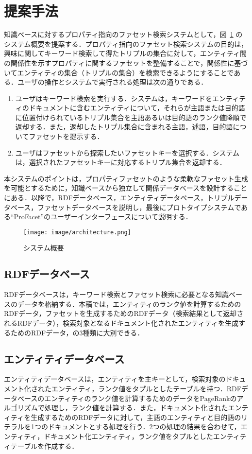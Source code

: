 \section{提案手法}
\label{sec:proposal}
知識ベースに対するプロパティ指向のファセット検索システムとして，図~\ref{fig:architecture} のシステム概要を提案する．プロパティ指向のファセット検索システムの目的は，興味に関してキーワード検索して得たトリプルの集合に対して，エンティティ間の関係性を示すプロパティに関するファセットを整備することで，関係性に基づいてエンティティの集合（トリプルの集合）を検索できるようにすることである．ユーザの操作とシステムで実行される処理は次の通りである．
\begin{enumerate}
	\item ユーザはキーワード検索を実行する．システムは，キーワードをエンティティのドキュメントに含むエンティティについて，それらが主語または目的語に位置付けられているトリプル集合を主語あるいは目的語のランク値降順で返却する．また，返却したトリプル集合に含まれる主語，述語，目的語についてファセットを提示する．
	\item ユーザはファセットから探索したいファセットキーを選択する．システムは，選択されたファセットキーに対応するトリプル集合を返却する．
\end{enumerate}

本システムのポイントは，プロパティファセットのような柔軟なファセット生成を可能とするために，知識ベースから独立して関係データベースを設計することにある．以降で，RDFデータベース，エンティティデータベース，トリプルデータベース，ファセットデータベースを説明し，最後にプロトタイプシステムである``ProFacet''のユーザーインターフェースについて説明する．
%
\begin{figure}[h]
\centering
\texttt{[image: image/architecture.png]}
\caption{\small
システム概要
}
\label{fig:architecture}
\end{figure}
%
\subsection{RDFデータベース}
RDFデータベースは，キーワード検索とファセット検索に必要となる知識ベースのデータを格納する．本稿では，エンティティのランク値を計算するためのRDFデータ，ファセットを生成するためのRDFデータ（検索結果として返却されるRDFデータ），検索対象となるドキュメント化されたエンティティを生成するためのRDFデータ，の3種類に大別できる．
%
\subsection{エンティティデータベース}
エンティティデータベースは，エンティティを主キーとして，検索対象のドキュメント化されたエンティティ，ランク値をタプルとしたテーブルを持つ．RDFデータベースのエンティティのランク値を計算するためのデータをPageRankのアルゴリズムで処理し，ランク値を計算する．また，ドキュメント化されたエンティティを生成するためのRDFデータに対して，主語のエンティティと目的語のリテラルを1つのドキュメントとする処理を行う．2つの処理の結果を合わせて，エンティティ，ドキュメント化エンティティ，ランク値をタプルとしたエンティティテーブルを作成する．
%
